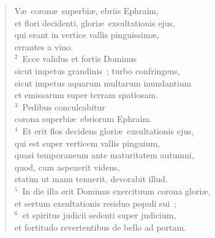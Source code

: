 \begin{flushleft}\begin{verse}\vspace{-19pt}\hspace{6pt}V\ae\ coron\ae\ superbi\ae , ebriis Ephraim,\\\hspace{6pt} et flori decidenti, glori\ae\ exsultationis ejus,\\ qui erant in vertice vallis pinguissim\ae ,\\ errantes a vino.\\
${}^{2}$~Ecce validus et fortis Dominus\\ sicut impetus grandinis~; turbo confringens,\\ sicut impetus aquarum multarum inundantium\\ et emissarum super terram spatiosam.\\
${}^{3}$~Pedibus conculcabitur\\ corona superbi\ae\ ebriorum Ephraim.\\
${}^{4}$~Et erit flos decidens glori\ae\ exsultationis ejus,\\ qui est super verticem vallis pinguium,\\ quasi temporaneum ante maturitatem autumni,\\ quod, cum aspexerit videns,\\ statim ut manu tenuerit, devorabit illud.\\
${}^{5}$~In die illa erit Dominus exercituum corona glori\ae ,\\ et sertum exsultationis residuo populi sui~;\\
${}^{6}$~et spiritus judicii sedenti super judicium,\\ et fortitudo revertentibus de bello ad portam.\end{verse}\end{flushleft}


